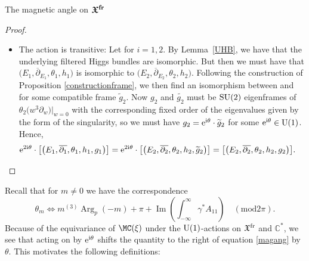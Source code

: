 \begin{subsubsection}{The magnetic angle on $\boldsymbol{\mathfrak{X}^{{\rm fr}}}$}
\begin{proof}
\begin{itemize}
 \item The action is transitive: Let  for $i=1,2$. By Lem\-ma~\ref{UHB}, we have that the underlying filtered Higgs bundles  are isomorphic. But then we must have that $\bigl(E_1,\overline{\partial}_{E_1},\theta_1,h_1\bigr)$ is isomorphic to $\bigl(E_2,\overline{\partial}_{E_2},\theta_2,h_2\bigr)$. Following the construction of Proposition \ref{constructionframe}, we then find an isomorphism between  and~ for some compatible frame $\widetilde{g}_2$. Now $g_2$ and $\widetilde{g_2}$ must be ${\rm SU}(2)$ eigenframes of $\theta_2\bigl(w^3\partial_w\bigr)|_{w=0}$ with the corresponding fixed order of the eigenvalues given by the form of the singularity, so we must have $ g_2={\rm e}^{{\rm i}\theta}\cdot\widetilde{g}_2$ for some ${\rm e}^{{\rm i}\theta} \in {\rm U}(1)$. Hence,
 \begin{equation*}
 {\rm e}^{2{\rm i}\theta}\cdot \bigl[\bigl(E_1,\overline{\partial_1},\theta_1,h_1,g_1\bigr)\bigr]= {\rm e}^{2{\rm i}\theta}\cdot \bigl[\bigl(E_2,\overline{\partial_2},\theta_2,h_2,\widetilde{g}_2\bigr)\bigr]=\bigl[\bigl(E_2,\overline{\partial_2},\theta_2,h_2,g_2\bigr)\bigr].\tag*{\qed}
 \end{equation*}
\end{itemize}\renewcommand{\qed}{}
\end{proof}

Recall that for $m\neq 0$ we have the correspondence
\begin{equation}\label{magang}
 \theta_m \iff m^{(3)}\operatorname{Arg}_p(-m)+\pi +\operatorname{Im}\left(\int_{-\infty}^{\infty}\gamma^*A_{11}\right) \quad (\text{mod} 2\pi).
\end{equation}
Because of the equivariance of $\MC(\xi)$ under the ${\rm U}(1)$-actions on $\mathfrak{X}^{{\rm fr}}$ and $\mathbb{C}^*$, we see that acting on  by ${\rm e}^{{\rm i}\theta}$ shifts the quantity to the right of equation \eqref{magang} by $\theta$. This motivates the following definitions:


\end{subsubsection}
